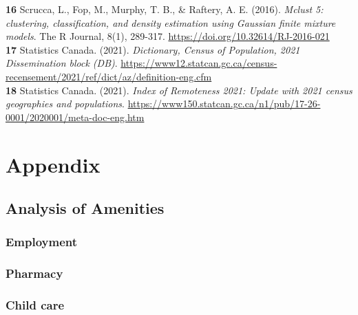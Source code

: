 \documentclass[11pt, a4paper]{article}
\newcommand{\comment}[1]{}
\begin{document}
\noindent\textbf{16} Scrucca, L., Fop, M., Murphy, T. B., \& Raftery, A. E. (2016). \textit{Mclust 5: clustering, classification, and density estimation using Gaussian finite mixture models}. The R Journal, 8(1), 289-317.  \sloppy\url{https://doi.org/10.32614/RJ-2016-021} \\

\noindent\textbf{17} Statistics Canada. (2021). \textit{Dictionary, Census of Population, 2021
Dissemination block (DB)}. \sloppy\url{https://www12.statcan.gc.ca/census-recensement/2021/ref/dict/az/definition-eng.cfm} \\

\noindent\textbf{18} Statistics Canada. (2021). \textit{Index of Remoteness 2021: Update with 2021 census geographies and populations}. \sloppy\url{https://www150.statcan.gc.ca/n1/pub/17-26-0001/2020001/meta-doc-eng.htm} \\













\comment{

\renewcommand{\bibsection}{}

} 







\pagebreak
\appendix
\section{Appendix}


\subsection{Analysis of Amenities}\label{appendix:analysis}


\subsubsection{Employment}





\subsubsection{Pharmacy}




\subsubsection{Child care}
\end{document}
